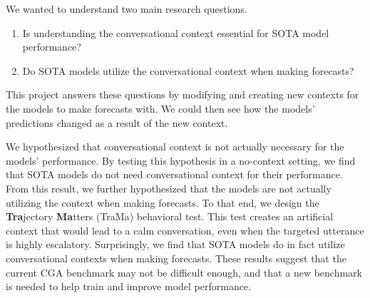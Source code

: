We wanted to understand two main research questions.
\begin{enumerate}
    \item Is understanding the conversational context essential for SOTA model performance?
    \item Do SOTA models utilize the conversational context when making forecasts?
\end{enumerate}
This project answers these questions by modifying and creating new contexts for the models to make forecasts with. 
We could then see how the models' predictions changed as a result of the new context. 

We hypothesized that conversational context is not actually necessary for the models' performance. 
By testing this hypothesis in a no-context setting, we find that SOTA models do not need conversational context for their performance.
From this result, we further hypothesized that the models are not actually utilizing the context when making forecasts. 
To that end, we design the \textbf{Tra}jectory \textbf{Ma}tters (TraMa) behavioral test.
This test creates an artificial context that would lead to a calm conversation, even when the targeted utterance is highly escalatory.
Surprisingly, we find that SOTA models do in fact utilize conversational contexts when making forecasts. 
These results suggest that the current CGA benchmark may not be difficult enough, and that a new benchmark is needed to help train and improve model performance. 
